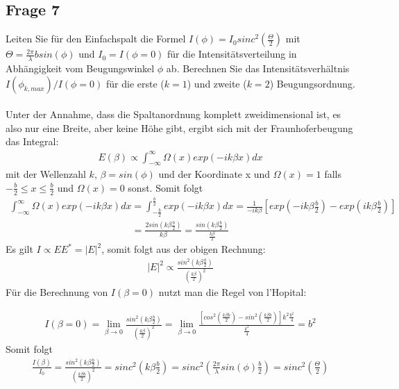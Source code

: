 \documentclass[a4paper,10pt]{scrartcl}
\begin{document}
\subsection{Frage 7}
Leiten Sie für den Einfachspalt die Formel \(I(\phi)=I_{0}sinc^{2}(\frac{\Theta}{2})\) mit \(\Theta = \frac{2\pi}{\lambda}bsin(\phi)\) und \(I_{0}=I(\phi=0)\) für die Intensitätsverteilung in Abhängigkeit vom Beugungswinkel \(\phi\) ab. Berechnen Sie das Intensitätsverhältnis \(I(\phi_{k,max})/I(\phi=0)\) für die erste (\(k=1\)) und zweite (\(k=2\)) Beugungsordnung.\\
\\
Unter der Annahme, dass die Spaltanordnung komplett zweidimensional ist, es also nur eine Breite, aber keine Höhe gibt, ergibt sich mit der Fraunhoferbeugung das Integral:
\begin{align*}
E(\beta)\propto\int_{-\infty}^{\infty}\Omega(x)exp(-ik\beta x)dx
\end{align*} 
mit der Wellenzahl \(k\), \(\beta =sin(\phi)\) und der Koordinate x und \(\Omega (x)=1\) falls \(-\frac{b}{2}\leq x \leq \frac{b}{2}\) und \(\Omega (x)=0\) sonst. Somit folgt
\begin{align*}
\int_{-\infty}^{\infty}\Omega(x)exp(-ik\beta x)dx=\int_{-\frac{b}{2}}^{\frac{b}{2}}exp(-ik\beta x)dx=\frac{1}{-ik\beta}[exp(-ik\beta\frac{b}{2})-exp(ik\beta\frac{b}{2})]
\end{align*}
\begin{align*}
=\frac{2sin(k\beta \frac{b}{2})}{k\beta}=\frac{sin(k\beta\frac{b}{2})}{\frac{k\beta}{2}}
\end{align*}
Es gilt \(I\propto EE^{*}=|E|^{2}\), somit folgt aus der obigen Rechnung:
\begin{align*}
|E|^{2}\propto\frac{sin^{2}(k\beta\frac{b}{2})}{(\frac{k\beta}{2})^{2}}
\end{align*}
Für die Berechnung von \(I(\beta=0)\) nutzt man die Regel von l'Hopital:

\begin{align*}
I(\beta=0)=\lim\limits_{\beta \rightarrow 0}{\frac{sin^{2}(k\beta\frac{b}{2})}{(\frac{k\beta}{2})^{2}}}=\lim\limits_{\beta \rightarrow 0}{\frac{[cos^{2}(\frac{k\beta b}{2})-sin^{2}(\frac{k\beta b}{2})]k^{2}\frac{b^{2}}{4}}{\frac{k^{2}}{4}}=b^{2}}
\end{align*}
Somit folgt 
\begin{align*}
\frac{I(\beta)}{I_{0}}=\frac{sin^{2}(k\beta\frac{b}{2})}{(\frac{k\beta b}{2})^{2}}=sinc^{2}(k\beta \frac{b}{2})=sinc^{2}(\frac{2\pi}{\lambda}sin(\phi)\frac{b}{2})=sinc^{2}(\frac{\Theta}{2})
\end{align*}
\end{document}
